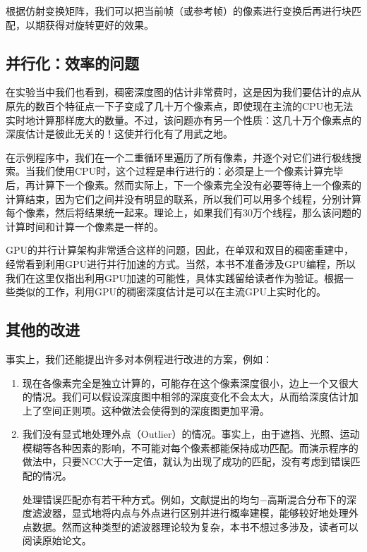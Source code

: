 根据仿射变换矩阵，我们可以把当前帧（或参考帧）的像素进行变换后再进行块匹配，以期获得对旋转更好的效果。

\subsection{并行化：效率的问题}
在实验当中我们也看到，稠密深度图的估计非常费时，这是因为我们要估计的点从原先的数百个特征点一下子变成了几十万个像素点，即使现在主流的CPU也无法实时地计算那样庞大的数量。不过，该问题亦有另一个性质：这几十万个像素点的深度估计是彼此无关的！这使并行化有了用武之地。

在示例程序中，我们在一个二重循环里遍历了所有像素，并逐个对它们进行极线搜索。当我们使用CPU时，这个过程是串行进行的：必须是上一个像素计算完毕后，再计算下一个像素。然而实际上，下一个像素完全没有必要等待上一个像素的计算结束，因为它们之间并没有明显的联系，所以我们可以用多个线程，分别计算每个像素，然后将结果统一起来。理论上，如果我们有30万个线程，那么该问题的计算时间和计算一个像素是一样的。

GPU的并行计算架构非常适合这样的问题，因此，在单双和双目的稠密重建中，经常看到利用GPU进行并行加速的方式。当然，本书不准备涉及GPU编程，所以我们在这里仅指出利用GPU加速的可能性，具体实践留给读者作为验证。根据一些类似的工作，利用GPU的稠密深度估计是可以在主流GPU上实时化的。

\subsection{其他的改进}
事实上，我们还能提出许多对本例程进行改进的方案，例如：

\begin{enumerate}
	\item 现在各像素完全是独立计算的，可能存在这个像素深度很小，边上一个又很大的情况。我们可以假设深度图中相邻的深度变化不会太大，从而给深度估计加上了空间正则项。这种做法会使得到的深度图更加平滑。
	\item 我们没有显式地处理外点（Outlier）的情况。事实上，由于遮挡、光照、运动模糊等各种因素的影响，不可能对每个像素都能保持成功匹配。而演示程序的做法中，只要NCC大于一定值，就认为出现了成功的匹配，没有考虑到错误匹配的情况。
	
	\hspace{2em}处理错误匹配亦有若干种方式。例如，文献\cite{Vogiatzis2011}提出的均匀−高斯混合分布下的深度滤波器，显式地将内点与外点进行区别并进行概率建模，能够较好地处理外点数据。然而这种类型的滤波器理论较为复杂，本书不想过多涉及，读者可以阅读原始论文。
\end{enumerate}

